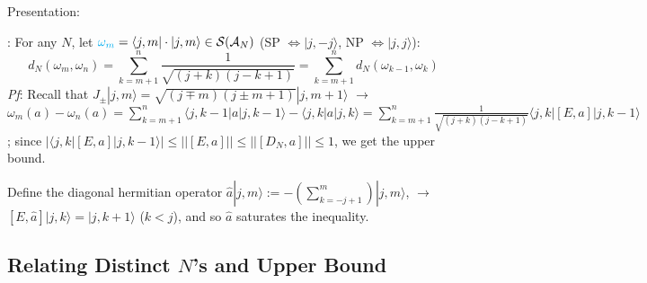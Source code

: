 {\color{gray} 
Presentation:

: For any $N$, let $\textcolor{cyan}{\omega_m} = \langle j, m| \cdot |j, m\rangle \in \mathcal S(\mathcal A_N)$ (SP $\Longleftrightarrow |j, -j\rangle$, NP $\Longleftrightarrow |j, j\rangle$):
\begin{equation}
    d_N(\omega_m, \omega_n) = \sum_{k = m+1}^n \frac{1}{\sqrt{(j+k)(j-k+1)}} = \sum_{k = m+1}^n d_N(\omega_{k-1}, \omega_k)
\end{equation}
\textit{Pf}: Recall that $J_\pm|j,m\rangle = \sqrt{(j\mp m)(j\pm m + 1)}|j, m+1 \rangle$ $\longrightarrow$ $\omega_m(a) - \omega_n(a) = \sum_{k = m+1}^n \langle j, k-1 |a|j, k-1 \rangle - \langle j, k |a| j, k \rangle = \sum_{k = m+1}^n \frac{1}{\sqrt{(j+k)(j-k+1)}} \langle j, k| [E, a] |j, k-1 \rangle$; since $|\langle j, k |[E, a]|j, k-1 \rangle|  \leq ||[E, a]|| \leq ||[D_N, a]|| \leq 1$, we get the upper bound. 

Define the diagonal hermitian operator $\hat a |j, m\rangle := - \left( \sum_{k = -j+1}^m  \right)|j, m\rangle$, $\longrightarrow$ $[E, \hat a] |j, k \rangle = |j, k+1\rangle$ ($k < j$), and so $\hat a$ saturates the inequality.
}

\linea
\subsection{Relating Distinct $N$'s and Upper Bound}

